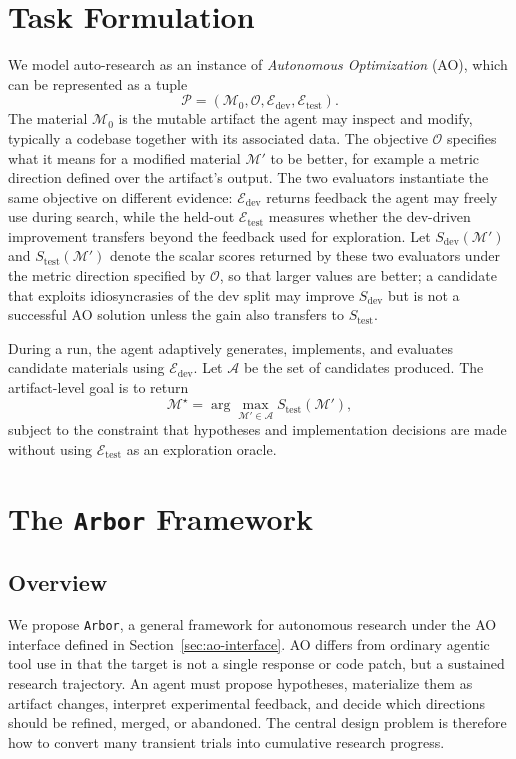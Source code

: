 \documentclass{llmxive}
\providecommand{\arbor}{\texttt{Arbor}}
\providecommand{\Mat}{\mathcal{M}}
\providecommand{\Obj}{\mathcal{O}}
\providecommand{\Eval}{\mathcal{E}}
\providecommand{\dev}{\mathrm{dev}}
\providecommand{\test}{\mathrm{test}}
\begin{document}
\section{Task Formulation}\label{sec:task}\label{sec:ao-interface}
We model auto-research as an instance of \emph{Autonomous Optimization}
(AO), which can be represented as a tuple
\[
\mathcal{P}=(\Mat_0,\Obj,\Eval_{\dev},\Eval_{\test}).
\]
The material $\Mat_0$ is the mutable artifact the agent may inspect and
modify, typically a codebase together with its associated data. The
objective $\Obj$ specifies what it means for a modified material $\Mat'$
to be better, for example a metric direction defined over the artifact's
output. The two evaluators instantiate the same objective on different
evidence: $\Eval_{\dev}$ returns feedback the agent may freely use
during search, while the held-out $\Eval_{\test}$ measures whether the
dev-driven improvement transfers beyond the feedback used for
exploration. Let $S_{\dev}(\Mat')$ and $S_{\test}(\Mat')$ denote the
scalar scores returned by these two evaluators under the metric
direction specified by $\Obj$, so that larger values are better; a
candidate that exploits idiosyncrasies of the dev split may improve
$S_{\dev}$ but is not a successful AO solution unless the gain also
transfers to $S_{\test}$.

During a run, the agent adaptively generates, implements, and evaluates
candidate materials using $\Eval_{\dev}$. Let $\mathcal{A}$ be the set
of candidates produced. The artifact-level goal is to return
\[
\Mat^\star = \arg\max_{\Mat' \in \mathcal{A}} S_{\test}(\Mat'),
\]
subject to the constraint that hypotheses and implementation decisions
are made without using $\Eval_{\test}$ as an exploration oracle.


\section{The \arbor{} Framework}\label{sec:framework}

\subsection{Overview}\label{sec:framework-overview}

We propose \arbor{}, a general framework for autonomous research under the AO interface defined in Section~\ref{sec:ao-interface}. AO differs from ordinary agentic tool use in that the target is not a single response or code patch, but a sustained research trajectory. An agent must propose hypotheses, materialize them as artifact changes, interpret experimental feedback, and decide which directions should be refined, merged, or abandoned. The central design problem is therefore how to convert many transient trials into cumulative research progress.
\end{document}

